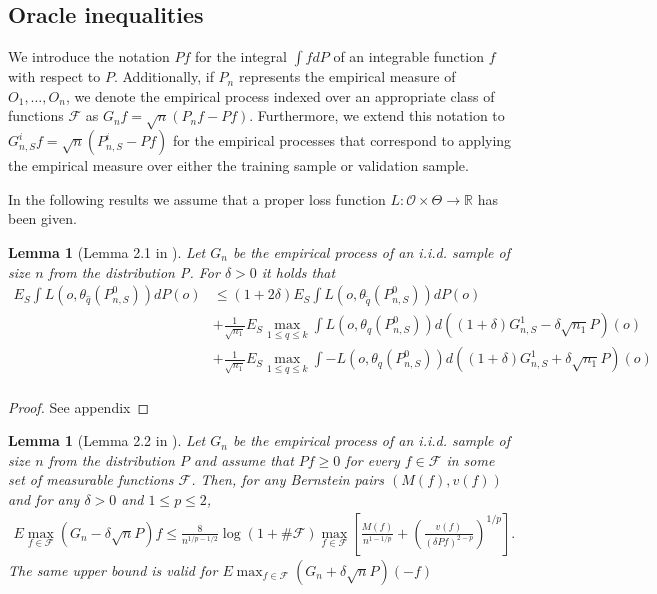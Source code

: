 \documentclass[11pt, a4paper]{article}
\newtheorem{lemma}[theorem]{Lemma}
\theoremstyle{definition}
\theoremstyle{remark}
\newcommand{\q}{q}
\newcommand{\btheta}{\theta}
\begin{document}
\subsection{Oracle inequalities}
We introduce the notation $Pf$ for the integral $\int f dP$ of an integrable function $f$ with respect to $P$. Additionally, if $P_n$ represents the empirical measure of $O_1, \dots, O_n$, we denote the empirical process indexed over an appropriate class of functions $\mathcal{F}$ as $G_n f = \sqrt{n}(P_n f - P f)$. Furthermore, we extend this notation to $G_{n, S}^{i} f = \sqrt{n}(P_{n, S}^{i} - Pf)$ for the empirical processes that correspond to applying the empirical measure over either the training sample or validation sample.

In the following results we assume that a proper loss function $ L: \mathcal{O} \times \Theta \to \mathbb{R} $ has been given.  
\begin{lemma}[Lemma 2.1 in \cite{vaart06}] \label{finitesampledecomp}
    Let $ G_{n} $ be the empirical process of an i.i.d. sample of size $ n $ from the distribution P. For $ \delta > 0 $ it holds that
   \begin{align*}
       E_{S} \int L(o, \btheta_{ \hat{\q}}(P_{n, S}^{0})) dP(o) &\leq (1 + 2 \delta) E_{S} \int L(o, \btheta_{ \tilde{\q} }(P_{n, S}^{0})) d P(o) \\ 
                                                                &+\frac{1}{\sqrt{n_1} } E_{S} \max_{1 \leq \q \leq k} \int L(o, \btheta_{\q}(P_{n, S}^{0})) d ((1 + \delta) G_{n,S}^{1} - \delta \sqrt{n_1} P)(o)  \\
                                                                &+\frac{1}{\sqrt{n_1} } E_{S} \max_{1 \leq \q \leq k} \int-L(o, \btheta_{\q}(P_{n, S}^{0})) d ((1 + \delta) G_{n,S}^{1} + \delta \sqrt{n_1} P)(o)  \\
   \end{align*}
\end{lemma}
\begin{proof}
    See appendix
\end{proof}

\begin{lemma}[Lemma 2.2 in \cite{vaart06}] \label{finitesamplebound}
    Let $G_{n}$ be the empirical process of an i.i.d. sample of size $n$ from the distribution $P$ and assume that $P f \geq 0$ for every $f \in \mathcal{F}$ in some set of measurable functions $ \mathcal{F} $. Then, for any Bernstein pairs $(M(f), v(f))$ and for any $\delta>0$ and $1 \leq p \leq 2$,
    \begin{align*}
    E \max_{f \in \mathcal{F}}(G_n-\delta \sqrt{n} P) f \leq \frac{8}{n^{1 / p-1 / 2}} \log (1+\# \mathcal{F}) \max _{f \in \mathcal{F}}\left[\frac{M(f)}{n^{1-1 / p}}+\left(\frac{v(f)}{(\delta P f)^{2-p}}\right)^{1 / p}\right].
    \end{align*}
    The same upper bound is valid for $ E \max_{f \in \mathcal{F}}(G_n+\delta \sqrt{n} P)(-f) $  
\end{lemma}
\end{document}
